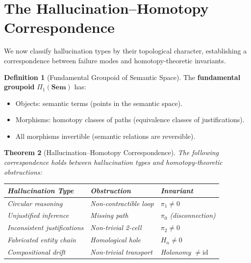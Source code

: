 \documentclass[11pt,a4paper,twocolumn]{article}
\theoremstyle{plain}
\newtheorem{theorem}{Theorem}[section]
\theoremstyle{definition}
\newtheorem{definition}[theorem]{Definition}
\newcommand{\Sem}{\mathbf{Sem}}
\newcommand{\id}{\mathrm{id}}
\begin{document}
\section{The Hallucination--Homotopy Correspondence}\label{sec:correspondence}

We now classify hallucination types by their topological character, establishing a correspondence between failure modes and homotopy-theoretic invariants.

\begin{definition}[Fundamental Groupoid of Semantic Space]\label{def:fundgrpd}
The \textbf{fundamental groupoid} $\Pi_1(\Sem)$ has:
\begin{itemize}[nosep]
  \item Objects: semantic terms (points in the semantic space).
  \item Morphisms: homotopy classes of paths (equivalence classes of justifications).
  \item All morphisms invertible (semantic relations are reversible).
\end{itemize}
\end{definition}

\begin{theorem}[Hallucination--Homotopy Correspondence]\label{thm:hallucination-obstruction}
The following correspondence holds between hallucination types and homotopy-theoretic obstructions:

\medskip
\begin{center}
\begin{tabular}{@{}lll@{}}
\toprule
\textbf{Hallucination Type} & \textbf{Obstruction} & \textbf{Invariant} \\
\midrule
Circular reasoning & Non-contractible loop & $\pi_1 \neq 0$ \\
Unjustified inference & Missing path & $\pi_0$ (disconnection) \\
Inconsistent justifications & Non-trivial 2-cell & $\pi_2 \neq 0$ \\
Fabricated entity chain & Homological hole & $H_n \neq 0$ \\
Compositional drift & Non-trivial transport & Holonomy $\neq \id$ \\
\bottomrule
\end{tabular}
\end{center}
\end{theorem}
\end{document}
